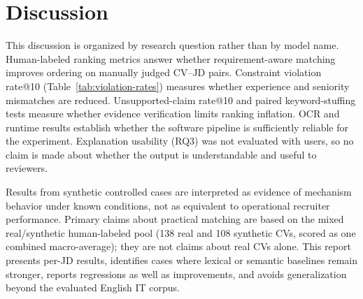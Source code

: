 \documentclass[12pt,a4paper,oneside]{report}
\begin{document}
\section{Discussion}
\label{sec:discussion}
This discussion is organized by research question rather than by model name. Human-labeled ranking metrics answer whether requirement-aware matching improves ordering on manually judged CV--JD pairs. Constraint violation rate@10 (Table~\ref{tab:violation-rates}) measures whether experience and seniority mismatches are reduced. Unsupported-claim rate@10 and paired keyword-stuffing tests measure whether evidence verification limits ranking inflation. OCR and runtime results establish whether the software pipeline is sufficiently reliable for the experiment. Explanation usability (RQ3) was not evaluated with users, so no claim is made about whether the output is understandable and useful to reviewers.

Results from synthetic controlled cases are interpreted as evidence of mechanism behavior under known conditions, not as equivalent to operational recruiter performance. Primary claims about practical matching are based on the mixed real/synthetic human-labeled pool (138 real and 108 synthetic CVs, scored as one combined macro-average); they are not claims about real CVs alone. This report presents per-JD results, identifies cases where lexical or semantic baselines remain stronger, reports regressions as well as improvements, and avoids generalization beyond the evaluated English IT corpus.
\end{document}
